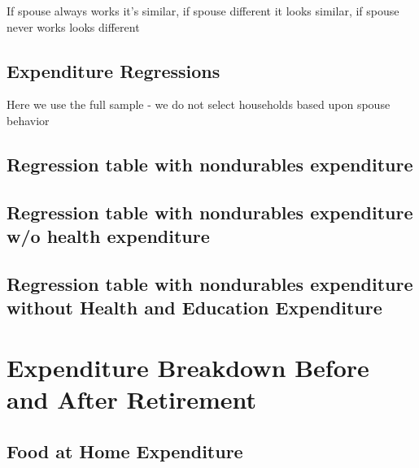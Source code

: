 \documentclass[a4paper]{article}
\begin{document}
If spouse always works it's similar, if spouse different it looks similar, if spouse never works looks different
\clearpage


\begin{landscape}
\section{Expenditure Regressions}

Here we use the full sample - we do not select households based upon spouse behavior

\subsection{Regression table with nondurables expenditure}

\clearpage

\subsection{Regression table with nondurables expenditure w/o health expenditure} 

\clearpage

\subsection{Regression table with nondurables expenditure without Health and Education Expenditure}

\clearpage
\end{landscape}
	
\section{Expenditure Breakdown Before and After Retirement}
\subsection{Food at Home Expenditure}

\begin{table}[h]
	\centering
	
\end{table}
\end{document}
